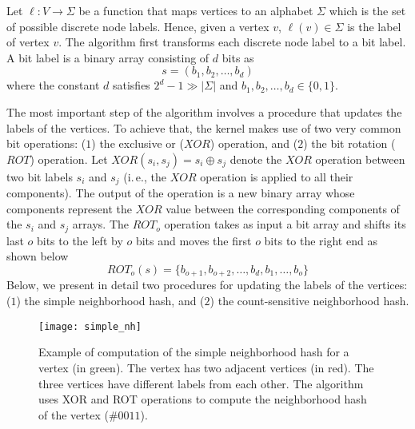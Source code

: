 \documentclass[twoside,11pt]{article}
\newcommand{\ie}{i.\,e., }
\begin{document}
Let $\ell : V \rightarrow \Sigma$ be a function that maps vertices to an alphabet $\Sigma$ which is the set of possible discrete node labels.
Hence, given a vertex $v$, $\ell(v) \in \Sigma$ is the label of vertex $v$.
The algorithm first transforms each discrete node label to a bit label.
A bit label is a binary array consisting of $d$ bits as
\begin{equation}
    s = (b_1, b_2, \ldots, b_d)
\end{equation}
where the constant $d$ satisfies $2^d - 1 \gg |\Sigma|$ and $b_1, b_2, \ldots, b_d \in \{0, 1\}$.

The most important step of the algorithm involves a procedure that updates the labels of the vertices.
To achieve that, the kernel makes use of two very common bit operations: ($1$) the exclusive or ($XOR$) operation, and ($2$) the bit rotation ($ROT$) operation.
Let $XOR(s_i, s_j) = s_i \oplus s_j$ denote the $XOR$ operation between two bit labels $s_i$ and $s_j$ (\ie the $XOR$ operation is applied to all their components).
The output of the operation is a new binary array whose components represent the $XOR$ value between the corresponding components of the $s_i$ and $s_j$ arrays.
The $ROT_o$ operation takes as input a bit array and shifts its last $o$ bits to the left by $o$ bits and moves the first $o$ bits to the right end as shown below  
\begin{equation}
    ROT_o(s) = \{ b_{o+1}, b_{o+2}, \ldots, b_d, b_1, \ldots, b_o \}
\end{equation}
Below, we present in detail two procedures for updating the labels of the vertices: ($1$) the simple neighborhood hash, and ($2$) the count-sensitive neighborhood hash.

\begin{figure}[t]
  \centering
  \texttt{[image: simple\_nh]}
  \caption{Example of computation of the simple neighborhood hash for a vertex (in green). The vertex has two adjacent vertices (in red). The three vertices have different labels from each other. The algorithm uses XOR and ROT operations to compute the neighborhood hash of the vertex ($\#0011$).}
  \label{fig:simple_nh}
\end{figure}
\end{document}
